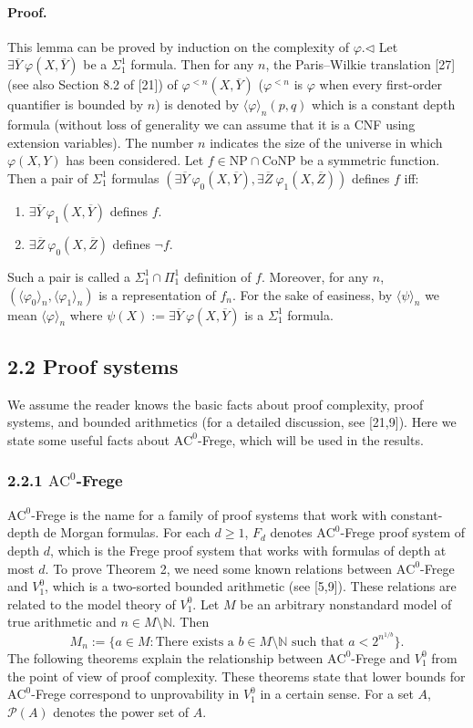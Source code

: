 \paragraph{Proof.} This lemma can be proved by induction on the complexity of $\varphi$.\hfill$\triangleleft$
Let $\exists\overline Y\ \varphi(X,\overline Y)$ be a $\Sigma_1^1$ formula. Then for any $n$, the Paris–Wilkie translation [27] (see also Section 8.2 of [21]) of $\varphi^{<n}(X,\overline Y)$ ($\varphi^{<n}$ is $\varphi$ when every first-order quantifier is bounded by $n$) is denoted by $\langle\varphi\rangle_n(p,q)$ which is a constant depth formula (without loss of generality we can assume that it is a CNF using extension variables). The number $n$ indicates the size of the universe in which $\varphi(X,Y)$ has been considered.
Let $f\in\mathrm{NP}\cap\mathrm{CoNP}$ be a symmetric function. Then a pair of $\Sigma_1^1$ formulas $(\exists\overline Y\ \varphi_0(X,\overline Y),\exists\overline Z\ \varphi_1(X,\overline Z))$ defines $f$ iff:
\begin{enumerate}
\item $\exists\overline Y\ \varphi_1(X,\overline Y)$ defines $f$.
\item $\exists\overline Z\ \varphi_0(X,\overline Z)$ defines $\neg f$.
\end{enumerate}
Such a pair is called a $\Sigma_1^1\cap\Pi_1^1$ definition of $f$. Moreover, for any $n$, $(\langle\varphi_0\rangle_n,\langle\varphi_1\rangle_n)$ is a representation of $f_n$. For the sake of easiness, by $\langle\psi\rangle_n$ we mean $\langle\varphi\rangle_n$ where $\psi(X):=\exists\overline Y\ \varphi(X,\overline Y)$ is a $\Sigma_1^1$ formula.
\subsection*{2.2 Proof systems}
We assume the reader knows the basic facts about proof complexity, proof systems, and bounded arithmetics (for a detailed discussion, see [21,9]). Here we state some useful facts about $\mathrm{AC}^0$-Frege, which will be used in the results.
\subsubsection*{2.2.1 $\mathrm{AC}^0$-Frege}
$\mathrm{AC}^0$-Frege is the name for a family of proof systems that work with constant-depth de Morgan formulas. For each $d\geq1$, $F_d$ denotes $\mathrm{AC}^0$-Frege proof system of depth $d$, which is the Frege proof system that works with formulas of depth at most $d$.
To prove Theorem 2, we need some known relations between $\mathrm{AC}^0$-Frege and $V_1^0$, which is a two-sorted bounded arithmetic (see [5,9]). These relations are related to the model theory of $V_1^0$.
Let $M$ be an arbitrary nonstandard model of true arithmetic and $n\in M\setminus\mathbb N$. Then
\[M_n:=\{a\in M:\text{There exists a }b\in M\setminus\mathbb N\text{ such that }a<2^{n^{1/b}}\}.\]
The following theorems explain the relationship between $\mathrm{AC}^0$-Frege and $V_1^0$ from the point of view of proof complexity. These theorems state that lower bounds for $\mathrm{AC}^0$-Frege correspond to unprovability in $V_1^0$ in a certain sense.
For a set $A$, $\mathcal P(A)$ denotes the power set of $A$.

